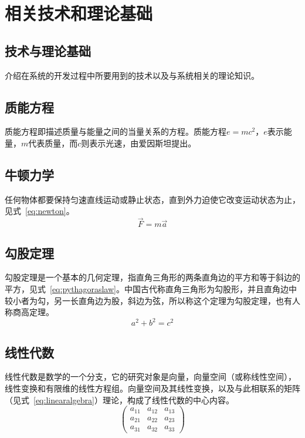 
\chapter{相关技术和理论基础}

\section{技术与理论基础}
介绍在系统的开发过程中所要用到的技术\cite{timmurphy}以及与系统相关的理论知识\cite{huwei2017latex2e}。

\section{质能方程}
质能方程即描述质量与能量之间的当量关系的方程\cite{liuxiaopingwordandtex,yassin1994latex}。质能方程$e=mc^2$，$e$表示能量，$m$代表质量，而$c$则表示光速，由爱因斯坦提出。

\section{牛顿力学}
任何物体都要保持匀速直线运动或静止状态\cite{liu2013latex}，直到外力迫使它改变运动状态为止，见式~\eqref{eq:newton}。
\begin{equation}\label{eq:newton}
	\vec{F}=m\vec{a} 
\end{equation}

\section{勾股定理}
勾股定理是一个基本的几何定理，指直角三角形的两条直角边的平方和等于斜边的平方，见式~\eqref{eq:pythagoraslaw}。中国古代称直角三角形为勾股形，并且直角边中较小者为勾，另一长直角边为股，斜边为弦，所以称这个定理为勾股定理，也有人称商高定理\cite{he2017mask}。
\begin{equation}\label{eq:pythagoraslaw}
    a^2 + b^2 = c^2  
\end{equation}

\section{线性代数}
线性代数是数学的一个分支，它的研究对象是向量，向量空间（或称线性空间），线性变换和有限维的线性方程组。向量空间及其线性变换，以及与此相联系的矩阵（见式~\eqref{eq:linearalgebra}）理论，构成了线性代数的中心内容。
\begin{equation}\label{eq:linearalgebra}
	\begin{pmatrix}
		a_{11} & a_{12} & a_{13}\\ 
		a_{21} & a_{22} & a_{23}\\  
		a_{31} & a_{32} & a_{33}   
	\end{pmatrix}  
\end{equation}

